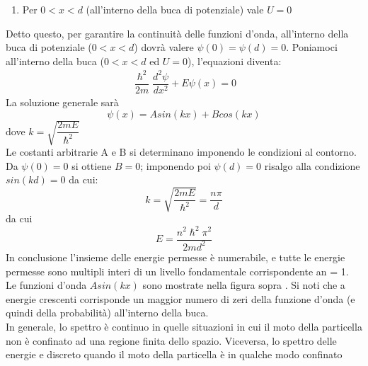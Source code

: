\begin{citbox}
\begin{enumerate}
    \item Per $0<x<d$ (all'interno della buca di potenziale) vale $U=0$
\end{enumerate}
Detto questo, per garantire la continuità delle funzioni d'onda, all'interno della buca di potenziale ($0<x<d$) dovrà valere $\psi(0)=\psi(d)=0$.
Poniamoci all'interno della buca ($0<x<d$ ed $U=0$), l'equazioni diventa:
\begin{align*}
    \dfrac{\hslash^2}{2m}\dfrac{d^2\psi}{dx^2}+E\psi(x)=0
\end{align*}
La soluzione generale sarà
\begin{equation*}
    \psi(x)=Asin(kx)+Bcos(kx)
\end{equation*}
dove $k=\sqrt{\dfrac{2mE}{\hslash^2}}$\\
Le costanti arbitrarie A e B si determinano imponendo le condizioni al contorno.
Da $\psi(0)=0$ si ottiene $B = 0$; imponendo poi $\psi(d)=0$ risalgo alla condizione $sin(kd)=0$ da cui:
\begin{equation*}
    k=\sqrt{\dfrac{2mE}{\hslash^2}}=\dfrac{n\pi}{d}
\end{equation*}
da cui 
\begin{equation*}
    E=\dfrac{n^2\hslash^2\pi^2}{2md^2}
\end{equation*}
In conclusione l'insieme delle energie permesse è numerabile, e tutte le energie permesse sono multipli interi di un livello fondamentale corrispondente an = 1. Le funzioni d'onda $A sin(kx)$ sono mostrate nella figura sopra . Si noti che a energie crescenti corrisponde un maggior numero di zeri della funzione d'onda (e quindi della probabilità)
all'interno della buca.\\
In generale, lo spettro è continuo in quelle situazioni in cui il moto della particella non
è confinato ad una regione finita dello spazio. Viceversa, lo spettro delle energie e discreto quando il moto della particella è in qualche modo confinato
\end{citbox}
%
